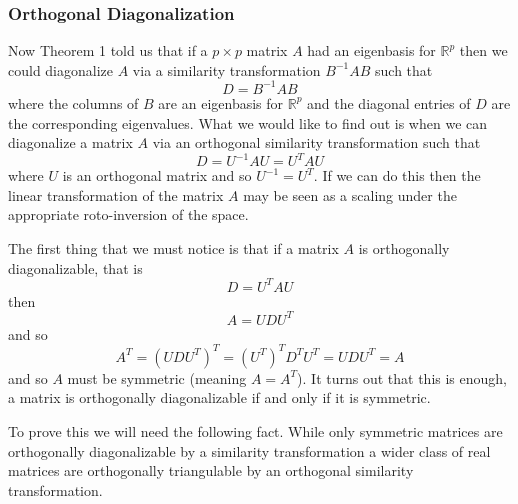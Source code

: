 \documentclass{book}
\begin{document}
\subsubsection{Orthogonal Diagonalization}Now Theorem 1 told us that if a $p \times p$ matrix $A$ had an eigenbasis for $\mathbb{R}^p$ then we could diagonalize $A$ via a similarity transformation $B^{-1}AB$ such that
$$
D=B^{-1}AB
$$
where the columns of $B$ are an eigenbasis for $\mathbb{R}^p$ and the diagonal entries of $D$ are the corresponding eigenvalues. What we would like to find out is when we can diagonalize a matrix $A$ via an orthogonal similarity transformation such that
$$
D=U^{-1}AU=U^TAU
$$
where $U$ is an orthogonal matrix and so $U^{-1}=U^T$. If we can do this then the linear transformation of the matrix $A$ may be seen as a scaling under the appropriate roto-inversion of the space. 

\newpage
The first thing that we must notice is that if a matrix $A$ is orthogonally diagonalizable, that is
$$
D=U^TAU
$$
then
$$
A=UDU^T
$$
and so 
$$
A^T=(UDU^T)^T=(U^T)^TD^TU^T=UDU^T=A
$$
and so $A$ must be symmetric (meaning $A=A^T$). It turns out that this is enough, a matrix is orthogonally diagonalizable if and only if it is symmetric. 

To prove this we will need the following fact. While only symmetric matrices are orthogonally diagonalizable by a similarity transformation a wider class of real matrices are orthogonally triangulable by an orthogonal similarity transformation.
\end{document}
